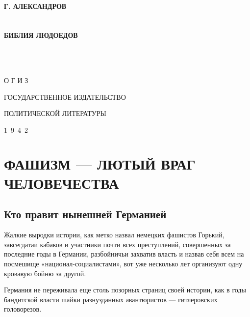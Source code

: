 \documentclass[12pt, a4paper, openany]{book}
\begin{document}
	
	\begin{titlepage}
		
		\begin{center}
			\vspace*{\fill}
			
			
			{\large\bf Г. АЛЕКСАНДРОВ\\}
			\ \\
			\ \\
			{\Huge\bf БИБЛИЯ ЛЮДОЕДОВ\\}
			\ \\
			\ \\
			\ \\
			\vspace*{\fill}
			
			\vfill
			
			
			О Г И З
			
			ГОСУДАРСТВЕННОЕ ИЗДАТЕЛЬСТВО
			
			ПОЛИТИЧЕСКОЙ ЛИТЕРАТУРЫ
			
			1\ 9\ 4\ 2
			

		\end{center}
		
	\end{titlepage}
	
	\thispagestyle{empty} %
	
	\newpage
	

\setcounter{secnumdepth}{0}
	
	\section[Фашизм --- лютый враг человечества]{\center \textbf{ФАШИЗМ --- ЛЮТЫЙ ВРАГ ЧЕЛОВЕЧЕСТВА}}
	
	\subsection*{\center \textbf{Кто правит нынешней Германией}}

Жалкие выродки истории, как метко назвал немецких фашистов Горький, завсегдатаи кабаков и участники почти всех преступлений, совершенных за последние годы в Германии, разбойничьи захватив власть и назвав себя всем на посмешище «национал-социалистами», вот уже несколько лет организуют одну кровавую бойню за другой.

Германия не переживала еще столь позорных страниц своей истории, как в годы бандитской власти шайки разнузданных авантюристов — гитлеровских головорезов.
\end{document}
